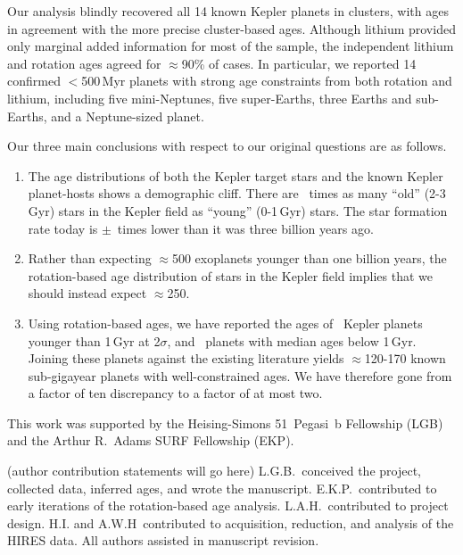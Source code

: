 \documentclass[11pt,twocolumn,tighten]{aastex63}
\begin{document}
Our analysis blindly recovered all 14 known Kepler planets in
clusters, with ages in agreement with the more precise cluster-based ages.
Although lithium provided only marginal added information for most of
the sample, the independent lithium and rotation ages agreed for
$\approx$90\% of cases.  In particular, we reported 
14 confirmed $<$500\,Myr planets
with strong age
constraints from both rotation and lithium, including five mini-Neptunes, five super-Earths,
three Earths and sub-Earths, and a Neptune-sized planet.

Our three main conclusions with respect to our original questions are
as follows.

\begin{enumerate}[leftmargin=*,topsep=0pt,itemsep=-1ex,partopsep=1ex,parsep=1ex]
  \item The age distributions of both the Kepler target stars and the
    known Kepler planet-hosts shows a demographic cliff.  There are
    \ratioobtoybstars\ times as many ``old'' (2-3\,Gyr) stars in the
    Kepler field as ``young'' (0-1\,Gyr) stars.  The star formation
    rate today is \ratiosfr$\pm$\uncratiosfr\ times lower than it was
    three billion years ago.
  \item Rather than expecting $\approx$500 exoplanets younger than one
    billion years, the rotation-based age distribution of stars in the
    Kepler field implies that we should instead expect $\approx$250.
  \item Using rotation-based ages, we have reported the ages of
    \nplyounggyrotwosigma\ Kepler planets younger than 1\,Gyr at 2$\sigma$,
    and \nplyounggyro\ planets with median ages below 1\,Gyr.
    Joining these planets against the existing literature yields
    $\approx$120-170 known sub-gigayear planets with well-constrained
    ages.  We have therefore gone from a factor of ten discrepancy to
    a factor of at most two.
\end{enumerate}


\acknowledgements
This work was supported by the Heising-Simons 51~Pegasi~b Fellowship
(LGB)
and the Arthur R.~Adams SURF Fellowship (EKP).

(author contribution statements will go here)
L.G.B.~conceived the project, collected data, 
inferred ages, and wrote the manuscript.
E.K.P.~contributed to early iterations of the rotation-based age analysis.
L.A.H.~contributed to project design.
H.I. and A.W.H~contributed to acquisition, reduction, and analysis of
the HIRES data.
All authors assisted in manuscript revision.
\end{document}
